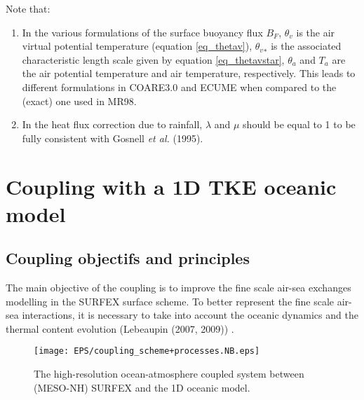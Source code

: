 Note that:
\begin{enumerate}
	\item In the various formulations of the surface buoyancy flux $B_F$, ${\theta}_v$ is the air virtual potential temperature
(equation \ref{eq_thetav}), ${{\theta}_v}_{*}$ is the associated characteristic length scale given by equation \ref{eq_thetavstar}, 
${\theta}_a$ and $T_a$ are the air potential temperature and air temperature, respectively. 
This leads to different formulations in COARE3.0 and ECUME when compared to the (exact) one used in MR98.
	\item In the heat flux correction due to rainfall, $\lambda$ and $\mu$ should be equal to 1 to be fully consistent with 
Gosnell \textit{et al.} (1995). %
\end{enumerate}


\newpage
\section{Coupling with a 1D TKE oceanic model}
\subsection{Coupling objectifs and principles}
The main objective of the coupling is to improve the fine scale air-sea exchanges modelling in the SURFEX surface scheme. To better represent the fine scale air-sea interactions, it is necessary to take into account the oceanic dynamics and the thermal content evolution (Lebeaupin \etal (2007, 2009)) %
. \\
\begin{figure}[!b]
\texttt{[image: EPS/coupling\_scheme+processes.NB.eps]}
\vspace{-0.75cm}
\caption{The high-resolution ocean-atmosphere coupled system between (MESO-NH) SURFEX and the 1D oceanic model. \label{scheme_coupled_syst}}
\end{figure}
 
